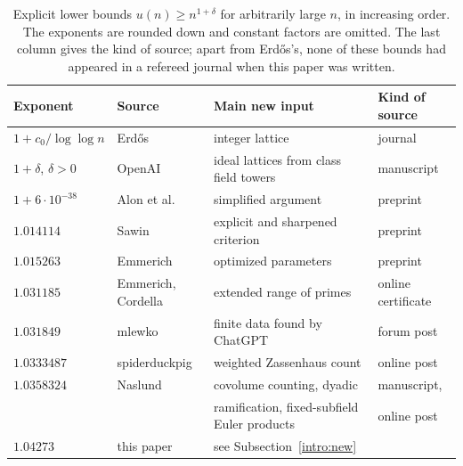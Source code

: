 \documentclass[11pt]{amsart}
\numberwithin{equation}{section}
\theoremstyle{definition}
\theoremstyle{remark}
\begin{document}
\begin{table}[htbp]
\centering
\caption{Explicit lower bounds $u(n)\ge n^{1+\delta}$ for arbitrarily
large $n$, in increasing order. The exponents are rounded down and
constant factors are omitted. The last column gives the kind of source;
apart from Erd\H{o}s's, none of these bounds had appeared in a refereed
journal when this paper was written.}
\label{intro:table-bounds}
\small
\begin{tabular}{@{}llll@{}}
\toprule
Exponent & Source & Main new input & Kind of source\\
\midrule
$1+c_0/\log\log n$ & Erd\H{o}s \cite{Erdos1946} & integer lattice & journal\\
$1+\delta$, $\delta>0$ & OpenAI \cite{OpenAI2026} & ideal lattices from class field towers & manuscript\\
$1+6\cdot10^{-38}$ & Alon et al.\ \cite{Alon2026} & simplified argument & preprint\\
$1.014114$ & Sawin \cite{Sawin2026} & explicit and sharpened criterion & preprint\\
$1.015263$ & Emmerich \cite{Emmerich2026} & optimized parameters & preprint\\
$1.031185$ & Emmerich, Cordella \cite{EmmerichCordella2026} & extended range of primes & online certificate\\
$1.031849$ & mlewko \cite{ErdosProblems90} & finite data found by ChatGPT & forum post\\
$1.0333487$ & spiderduckpig \cite{SpiderduckpigMO2026} & weighted Zassenhaus count & online post\\
$1.0358324$ & Naslund \cite{Naslund0358,NaslundMO2026} & covolume counting, dyadic & manuscript,\\
 & & ramification, fixed-subfield Euler products & online post\\
$1.04273$ & this paper & see Subsection~\ref{intro:new} & \\
\bottomrule
\end{tabular}
\end{table}
\end{document}
